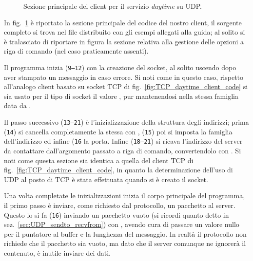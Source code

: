\begin{figure}[!htbp] 
  \footnotesize \centering
  \begin{minipage}[c]{\codesamplewidth}
  \end{minipage} 
  \normalsize
  \caption{Sezione principale del client per il servizio \textit{daytime} su
    UDP.}
  \label{fig:UDP_daytime_client}
\end{figure}

In fig.~\ref{fig:UDP_daytime_client} è riportato la sezione principale del
codice del nostro client, il sorgente completo si trova nel file
 distribuito con gli esempi allegati alla guida; al
solito si è tralasciato di riportare in figura la sezione relativa alla
gestione delle opzioni a riga di comando (nel caso praticamente assenti).

Il programma inizia (\texttt{\small 9--12}) con la creazione del socket, al
solito uscendo dopo aver stampato un messaggio in caso errore. Si noti come in
questo caso, rispetto all'analogo client basato su socket TCP di
fig.~\ref{fig:TCP_daytime_client_code} si sia usato per il tipo di socket il
valore , pur mantenendosi nella stessa famiglia data da
.

Il passo successivo (\texttt{\small 13--21}) è l'inizializzazione della
struttura degli indirizzi; prima (\texttt{\small 14}) si cancella
completamente la stessa con , (\texttt{\small 15}) poi si imposta
la famiglia dell'indirizzo ed infine (\texttt{\small 16} la porta. Infine
(\texttt{\small 18--21}) si ricava l'indirizzo del server da contattare
dall'argomento passato a riga di comando, convertendolo con .
Si noti come questa sezione sia identica a quella del client TCP di
fig.~\ref{fig:TCP_daytime_client_code}, in quanto la determinazione dell'uso
di UDP al posto di TCP è stata effettuata quando si è creato il socket.

Una volta completate le inizializzazioni inizia il corpo principale del
programma, il primo passo è inviare, come richiesto dal protocollo, un
pacchetto al server. Questo lo si fa (\texttt{\small 16}) inviando un
pacchetto vuoto (si ricordi quanto detto in
sez.~\ref{sec:UDP_sendto_recvfrom}) con , avendo cura di passare
un valore nullo per il puntatore al buffer e la lunghezza del messaggio. In
realtà il protocollo non richiede che il pacchetto sia vuoto, ma dato che il
server comunque ne ignorerà il contenuto, è inutile inviare dei dati.

